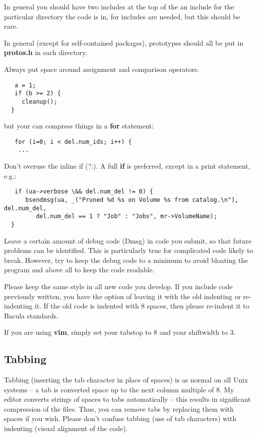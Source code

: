 In general you should have two includes at the top of the an include for the
particular directory the code is in, for includes are needed, but this should
be rare. 

In general (except for self-contained packages), prototypes should all be put
in {\bf protos.h} in each directory. 

Always put space around assignment and comparison operators. 

\footnotesize
\begin{verbatim}
   a = 1;
   if (b >= 2) {
     cleanup();
  }
\end{verbatim}
\normalsize

but your can compress things in a {\bf for} statement: 

\footnotesize
\begin{verbatim}
   for (i=0; i < del.num_ids; i++) {
    ...
\end{verbatim}
\normalsize

Don't overuse the inline if (?:). A full {\bf if} is preferred, except in a
print statement, e.g.: 

\footnotesize
\begin{verbatim}
   if (ua->verbose \&& del.num_del != 0) {
      bsendmsg(ua, _("Pruned %d %s on Volume %s from catalog.\n"), del.num_del,
         del.num_del == 1 ? "Job" : "Jobs", mr->VolumeName);
  }
\end{verbatim}
\normalsize

Leave a certain amount of debug code (Dmsg) in code you submit, so that future
problems can be identified. This is particularly true for complicated code
likely to break. However, try to keep the debug code to a minimum to avoid
bloating the program and above all to keep the code readable. 

Please keep the same style in all new code you develop. If you include code
previously written, you have the option of leaving it with the old indenting
or re-indenting it. If the old code is indented with 8 spaces, then please
re-indent it to Bacula standards. 

If you are using {\bf vim}, simply set your tabstop to 8 and your shiftwidth
to 3. 

\subsection{Tabbing}

Tabbing (inserting the tab character in place of spaces) is as normal on all
Unix systems -- a tab is converted space up to the next column multiple of 8.
My editor converts strings of spaces to tabs automatically -- this results in
significant compression of the files. Thus, you can remove tabs by replacing
them with spaces if you wish. Please don't confuse tabbing (use of tab
characters) with indenting (visual alignment of the code). 

